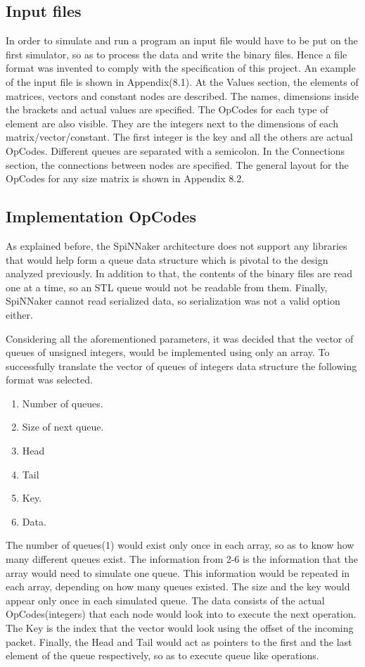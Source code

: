 \documentclass[12pt,twosided]{article}
\begin{document}
\subsection{Input files}
In order to simulate and run a program an input file would have to be put on the first simulator, so as to process the data and write the binary files. Hence a file format was invented to comply with the specification of this project. An example of the input file is shown in Appendix(8.1). At the Values section, the elements of matrices, vectors and constant nodes are described. The names, dimensions inside the brackets and actual values are specified. The OpCodes for each type of element are also visible. They are the integers next to the dimensions of each matrix/vector/constant. The first integer is the key and all the others are actual OpCodes. Different queues are separated with a semicolon. In the Connections section, the connections between nodes are specified. The general layout for the OpCodes for any size matrix  is shown in Appendix 8.2.
\subsection{Implementation OpCodes}
As explained before, the SpiNNaker architecture does not support any libraries that would help form a queue data structure which is pivotal to the design analyzed previously. In addition to that, the contents of the binary files are read one at a time, so an STL queue would not be readable from them. Finally, SpiNNaker cannot read serialized data, so serialization was not a valid option either.

Considering all the aforementioned parameters, it was decided that the vector of queues of unsigned integers, would be implemented using only an array. To successfully translate the vector of queues of integers data structure the following format was selected.

\begin{enumerate}
\item Number of queues.
\item Size of next queue.
\item Head
\item Tail
\item Key.
\item Data.
\end{enumerate}
The number of queues(1) would exist only once in each array, so as to know how many different queues exist. The information from 2-6 is the information that the array would need to simulate one queue. This information would be repeated in each array, depending on how many queues existed. The size and the key would appear only once in each simulated queue. The data consists of the actual OpCodes(integers) that each node would look into to execute the next operation. The Key is the index that the vector would look using the offset of the incoming packet. Finally, the Head and Tail would act as pointers to the first and the last element of the queue respectively, so as to execute queue like operations.
\end{document}
